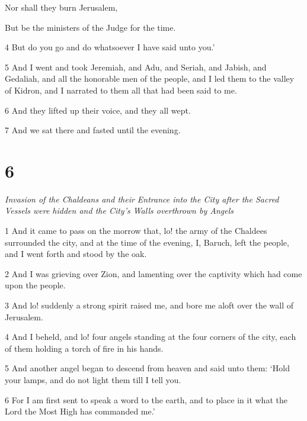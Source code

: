 \par Nor shall they burn Jerusalem,

\par But be the ministers of the Judge for the time.

\par 4 But do you go and do whatsoever I have said unto you.’


\par 5 And I went and took Jeremiah, and Adu, and Seriah, and Jabish, and Gedaliah, and all the honorable men of the people, and I led them to the valley of Kidron, and I narrated to them all that had been said to me. 

\par 6 And they lifted up their voice, and they all wept. 

\par 7 And we sat there and fasted until the evening.

\chapter{6}

\par \textit{Invasion of the Chaldeans and their Entrance into the City after the Sacred Vessels were hidden and the City's Walls overthrown by Angels}

\par 1 And it came to pass on the morrow that, lo! the army of the Chaldees surrounded the city, and at the time of the evening, I, Baruch, left the people, and I went forth and stood by the oak. 

\par 2 And I was grieving over Zion, and lamenting over the captivity which had come upon the people. 

\par 3 And lo! suddenly a strong spirit raised me, and bore me aloft over the wall of Jerusalem. 

\par 4 And I beheld, and lo! four angels standing at the four corners of the city, each of them holding a torch of fire in his hands. 

\par 5 And another angel began to descend from heaven and said unto them: ‘Hold your lamps, and do not light them till I tell you. 

\par 6 For I am first sent to speak a word to the earth, and to place in it what the Lord the Most High has commanded me.’

